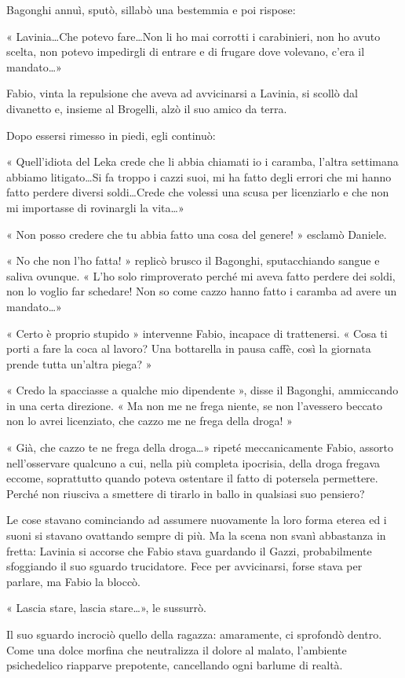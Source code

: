 Bagonghi annuì, sputò, sillabò una bestemmia e poi rispose:

« Lavinia\ldots Che potevo fare\ldots Non li ho mai corrotti i carabinieri, non ho avuto scelta, non potevo impedirgli di entrare e di frugare dove volevano, c'era il mandato\ldots »

Fabio, vinta la repulsione che aveva ad avvicinarsi a Lavinia, si scollò dal divanetto e, insieme al Brogelli, alzò il suo amico da terra.

Dopo essersi rimesso in piedi, egli continuò:

« Quell'idiota del Leka crede che li abbia chiamati io i caramba, l'altra settimana abbiamo litigato\ldots Si fa troppo i cazzi suoi, mi ha fatto degli errori che mi hanno fatto perdere diversi soldi\ldots Crede che volessi una scusa per licenziarlo e che non mi importasse di rovinargli la vita\ldots »

« Non posso credere che tu abbia fatto una cosa del genere! » esclamò Daniele.

« No che non l'ho fatta! » replicò brusco il Bagonghi, sputacchiando sangue e saliva ovunque. « L'ho solo rimproverato perché mi aveva fatto perdere dei soldi, non lo voglio far schedare! Non so come cazzo hanno fatto i caramba ad avere un mandato\ldots »

« Certo è proprio stupido » intervenne Fabio, incapace di trattenersi. « Cosa ti porti a fare la coca al lavoro? Una bottarella in pausa caffè, così la giornata prende tutta un'altra piega? »

« Credo la spacciasse a qualche mio dipendente », disse il Bagonghi, ammiccando in una certa direzione. « Ma non me ne frega niente, se non l'avessero beccato non lo avrei licenziato, che cazzo me ne frega della droga! »

« Già, che cazzo te ne frega della droga\ldots » ripeté meccanicamente Fabio, assorto nell'osservare qualcuno a cui, nella più completa ipocrisia, della droga fregava eccome, soprattutto quando poteva ostentare il fatto di potersela permettere. Perché non riusciva a smettere di tirarlo in ballo in qualsiasi suo pensiero?

Le cose stavano cominciando ad assumere nuovamente la loro forma eterea ed i suoni si stavano ovattando sempre di più. Ma la scena non svanì abbastanza in fretta: Lavinia si accorse che Fabio stava guardando il Gazzi, probabilmente sfoggiando il suo sguardo trucidatore. Fece per avvicinarsi, forse stava per parlare, ma Fabio la bloccò.

« Lascia stare, lascia stare\ldots », le sussurrò.

Il suo sguardo incrociò quello della ragazza: amaramente, ci sprofondò dentro. Come una dolce morfina che neutralizza il dolore al malato, l'ambiente psichedelico riapparve prepotente, cancellando ogni barlume di realtà.
